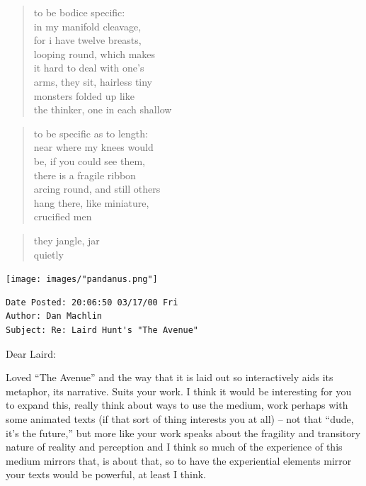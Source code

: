 \documentclass[
]{memoir}
\begin{document}
\begin{verse}
to be bodice specific:\\
in my manifold cleavage,\\
for i have twelve breasts,\\
looping round, which makes\\
it hard to deal with one’s\\
arms, they sit, hairless tiny\\
monsters folded up like\\
the thinker, one in each shallow\\
\end{verse}

\begin{verse}
to be specific as to length:\\
near where my knees would\\
be, if you could see them,\\
there is a fragile ribbon\\
arcing round, and still others\\
hang there, like miniature,\\
crucified men\\
\end{verse}

\begin{verse}
they jangle, jar\\
quietly\\
\end{verse}

\begin{center}\texttt{[image: images/"pandanus.png"]}\end{center}

\begin{verbatim}
Date Posted: 20:06:50 03/17/00 Fri
Author: Dan Machlin
Subject: Re: Laird Hunt's "The Avenue"
\end{verbatim}

Dear Laird:

Loved ``The Avenue'' and the way that it is laid out so interactively
aids its metaphor, its narrative. Suits your work. I think it would be
interesting for you to expand this, really think about ways to use the
medium, work perhaps with some animated texts (if that sort of thing
interests you at all) -- not that ``dude, it's the future,'' but more
like your work speaks about the fragility and transitory nature of
reality and perception and I think so much of the experience of this
medium mirrors that, is about that, so to have the experiential elements
mirror your texts would be powerful, at least I think.
\end{document}
